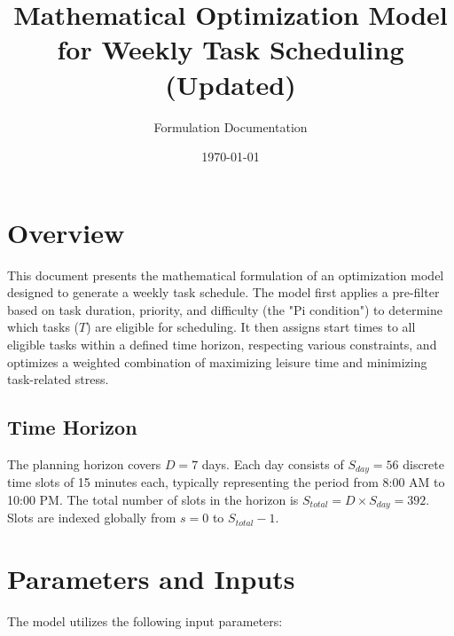 \documentclass{article}
\title{Mathematical Optimization Model for Weekly Task Scheduling (Updated)}
\author{Formulation Documentation}
\date{\today}
\begin{document}
\maketitle

\section{Overview}

This document presents the mathematical formulation of an optimization model designed to generate a weekly task schedule. The model first applies a pre-filter based on task duration, priority, and difficulty (the "Pi condition") to determine which tasks ($T$) are eligible for scheduling. It then assigns start times to all eligible tasks within a defined time horizon, respecting various constraints, and optimizes a weighted combination of maximizing leisure time and minimizing task-related stress.

\subsection*{Time Horizon}
The planning horizon covers $D = 7$ days. Each day consists of $S_{day} = 56$ discrete time slots of 15 minutes each, typically representing the period from 8:00 AM to 10:00 PM. The total number of slots in the horizon is $S_{total} = D \times S_{day} = 392$. Slots are indexed globally from $s = 0$ to $S_{total}-1$.

\section{Parameters and Inputs}

The model utilizes the following input parameters:
\end{document}
